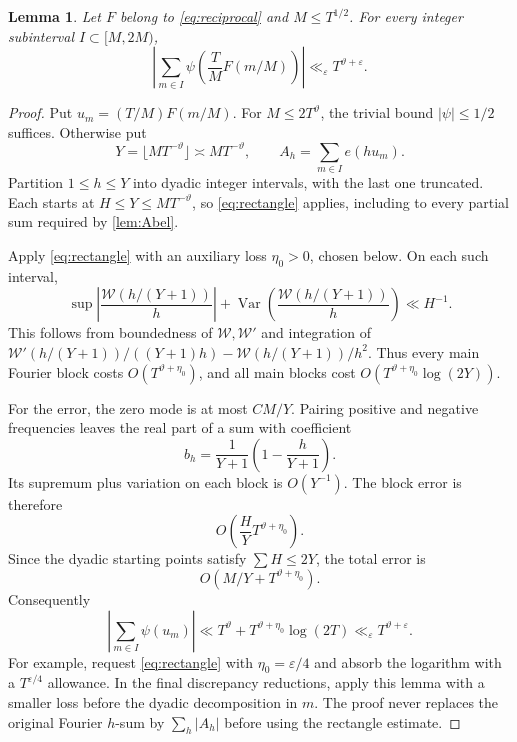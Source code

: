 \documentclass[11pt,reqno]{amsart}
\numberwithin{equation}{section}
\newtheorem{lemma}[lemma]{Lemma}
\theoremstyle{definition}
\theoremstyle{remark}
\newcommand{\eps}{\varepsilon}
\newcommand{\vth}{\vartheta}
\newcommand{\Var}{\operatorname{Var}}
\begin{document}
\begin{lemma}\label{lem:sawtooth}
Let $F$ belong to \eqref{eq:reciprocal} and $M\le T^{1/2}$.
For every integer subinterval $I\subset[M,2M)$,
\begin{equation}\label{eq:sawtoothbound}
 \left|\sum_{m\in I}\psi\left(\frac TM F(m/M)\right)\right|
 \ll_\eps T^{\vth+\eps}.
\end{equation}
\end{lemma}
\begin{proof}
Put $u_m=(T/M)F(m/M)$. For $M\le2T^\vth$, the trivial bound $|\psi|\le1/2$ suffices. Otherwise put
\[
 Y=\lfloor MT^{-\vth}\rfloor\asymp MT^{-\vth},\qquad
 A_h=\sum_{m\in I}e(hu_m).
\]
Partition $1\le h\le Y$ into dyadic integer intervals, with the last one truncated. Each starts at $H\le Y\le MT^{-\vth}$, so \eqref{eq:rectangle} applies, including to every partial sum required by \cref{lem:Abel}.

Apply \eqref{eq:rectangle} with an auxiliary loss $\eta_0>0$, chosen below. On each such interval,
\[
 \sup\left|\frac{\mathcal W(h/(Y+1))}{h}\right|
 +\Var\left(\frac{\mathcal W(h/(Y+1))}{h}\right)\ll H^{-1}.
\]
This follows from boundedness of $\mathcal W,\mathcal W'$ and integration of
$\mathcal W'(h/(Y+1))/((Y+1)h)-\mathcal W(h/(Y+1))/h^2$.
Thus every main Fourier block costs $O(T^{\vth+\eta_0})$, and all main blocks cost
$O(T^{\vth+\eta_0}\log(2Y))$.

For the error, the zero mode is at most $C M/Y$. Pairing positive and negative frequencies leaves the real part of a sum with coefficient
\[
 b_h=\frac1{Y+1}\left(1-\frac h{Y+1}\right).
\]
Its supremum plus variation on each block is $O(Y^{-1})$. The block error is therefore
\[
 O\left(\frac HY T^{\vth+\eta_0}\right).
\]
Since the dyadic starting points satisfy $\sum H\le2Y$, the total error is
\[
 O\left(M/Y+T^{\vth+\eta_0}\right).
\]
Consequently
\begin{equation}\label{eq:sawtoothassembly}
 \left|\sum_{m\in I}\psi(u_m)\right|
 \ll T^\vth+T^{\vth+\eta_0}\log(2T)
 \ll_\eps T^{\vth+\eps}.
\end{equation}
For example, request \eqref{eq:rectangle} with $\eta_0=\eps/4$ and absorb the logarithm with a $T^{\eps/4}$ allowance. In the final discrepancy reductions, apply this lemma with a smaller loss before the dyadic decomposition in $m$. The proof never replaces the original Fourier $h$-sum by $\sum_h|A_h|$ before using the rectangle estimate.

\end{proof}
\end{document}
